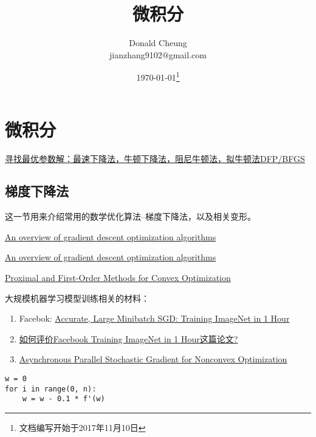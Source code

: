 \ifx\mathnotes\undefined
    \providecommand{\notesroot}{../..}
    \providecommand{\calculusroot}{.}

    \title{微积分}
    \author{Donald Cheung\\jianzhang9102@gmail.com}
    \date{\today\footnote{文档编写开始于2017年11月10日}}

    
\else
    \providecommand{\calculusroot}{\mathroot/calculus}
\fi

\chapter{微积分}
\href{http://dataunion.org/20714.html}{寻找最优参数解：最速下降法，牛顿下降法，阻尼牛顿法，拟牛顿法DFP/BFGS}

\section{梯度下降法}

这一节用来介绍常用的数学优化算法--梯度下降法，以及相关变形。

\href{https://arxiv.org/abs/1609.04747}{An overview of gradient descent optimization algorithms}

\href{http://ruder.io/optimizing-gradient-descent}{An overview of gradient descent optimization algorithms}

\href{https://cs.stanford.edu/~ppasupat/a9online/uploads/proximal_notes.pdf}{Proximal and First-Order Methods for Convex Optimization}


大规模机器学习模型训练相关的材料：
\begin{enumerate}
    \item Facebok: \href{https://arxiv.org/abs/1706.02677}{Accurate, Large Minibatch SGD: Training ImageNet in 1 Hour}
    \item \href{https://www.zhihu.com/question/60874090}{如何评价Facebook Training ImageNet in 1 Hour这篇论文?}
    \item \href{https://arxiv.org/abs/1506.08272}{Asynchronous Parallel Stochastic Gradient for Nonconvex Optimization}
\end{enumerate}


\begin{verbatim}
w = 0
for i in range(0, n):
    w = w - 0.1 * f'(w)
\end{verbatim}

